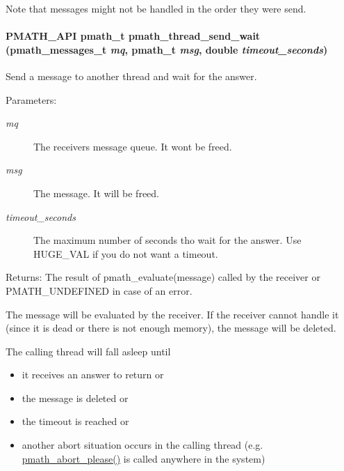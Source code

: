 Note that messages might not be handled in the order they were send. \hypertarget{group__threadmsg_g0466f7731e5e7cc3c4361f9512795a1c}{
\paragraph[{pmath\_\-thread\_\-send\_\-wait}]{\setlength{\rightskip}{0pt plus 5cm}PMATH\_\-API {\bf pmath\_\-t} pmath\_\-thread\_\-send\_\-wait ({\bf pmath\_\-messages\_\-t} {\em mq}, \/  {\bf pmath\_\-t} {\em msg}, \/  double {\em timeout\_\-seconds})}\hfill}
\label{group__threadmsg_g0466f7731e5e7cc3c4361f9512795a1c}


Send a message to another thread and wait for the answer. 

\begin{Desc}
\item[Parameters:]
\begin{description}
\item[{\em mq}]The receivers message queue. It wont be freed. \item[{\em msg}]The message. It will be freed. \item[{\em timeout\_\-seconds}]The maximum number of seconds tho wait for the answer. Use HUGE\_\-VAL if you do not want a timeout. \end{description}
\end{Desc}
\begin{Desc}
\item[Returns:]The result of pmath\_\-evaluate(message) called by the receiver or PMATH\_\-UNDEFINED in case of an error.\end{Desc}
The message will be evaluated by the receiver. If the receiver cannot handle it (since it is dead or there is not enough memory), the message will be deleted.

The calling thread will fall asleep until\begin{itemize}
\item it receives an answer to return or\item the message is deleted or\item the timeout is reached or\item another abort situation occurs in the calling thread (e.g. \hyperlink{group__threads_g84e45036b76764def6390af12d2070bf}{pmath\_\-abort\_\-please()} is called anywhere in the system)\end{itemize}


